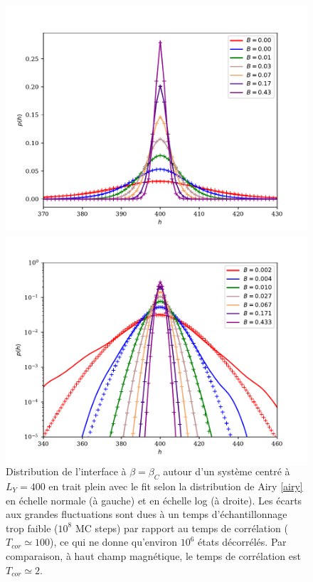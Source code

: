 \begin{figure}[t]
	\begin{minipage}[t]{0.5\linewidth}
		\includegraphics[width=\linewidth]{sosequi-laser/histo.pdf}
	\end{minipage}%
	\begin{minipage}[t]{0.5\linewidth}
		\includegraphics[width=\linewidth]{sosequi-laser/loghisto.pdf}
	\end{minipage}
	\caption{ Distribution de l'interface à $\beta = \beta_C$ autour d'un système centré à $L_Y=400$ en trait plein avec le fit selon la distribution de Airy \ref{airy} en échelle normale (à gauche) et en échelle log (à droite). Les écarts aux grandes fluctuations sont dues à un temps d’échantillonnage trop faible ($10^8$ MC steps) par rapport au temps de corrélation ($T_{cor} \simeq 100$), ce qui ne donne qu'environ $10^6$ états décorrélés. Par comparaison, à haut champ magnétique, le temps de corrélation est $T_{cor} \simeq 2$.}
	\label{histo_airy}
\end{figure}


